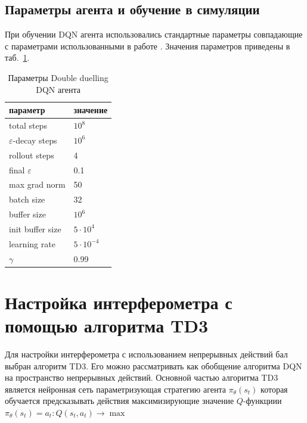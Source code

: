 \subsection{Параметры агента и обучение в симуляции}

При обучении DQN агента использовались стандартные параметры совпадающие с параметрами использованными в работе \cite{mnih2013atari}. Значения параметров приведены в таб.~\ref{tab:dqn_params}.

\begin{table} [htbp]
    \centering
    \begin{threeparttable}%
        \caption{Параметры Double duelling DQN агента}\label{tab:dqn_params}%
        \begin{tabular}{| p{5cm} || p{5cm} |}
            \hline
            \hline
            параметр & значение \\
            \hline
            total steps & $10^8$ \\
            $\varepsilon$-decay steps & $10^6$ \\
            rollout steps & 4 \\
            final $\varepsilon$ & 0.1 \\
            max grad norm & 50 \\
            batch size & 32 \\
            buffer size & $10^6$ \\
            init buffer size & $5 \cdot 10^4$ \\
            learning rate & $5 \cdot 10^{-4}$ \\
            $\gamma$ & 0.99 \\
            \hline
            \hline
        \end{tabular}
    \end{threeparttable}
\end{table}

                        
\section{Настройка интерферометра с помощью алгоритма TD3}

Для настройки интерферометра с использованием непрерывных действий бал выбран алгоритм TD3. Его можно рассматривать как обобщение алгоритма DQN на пространство непрерывных действий. Основной частью алгоритма TD3 является нейронная сеть параметризующая стратегию агента $\pi_{\theta}(s_t)$ которая обучается предсказывать действия максимизирующие значение $Q$-функциии $\pi_{\theta}(s_t) = a_t: Q(s_t, a_t) \to \max$

